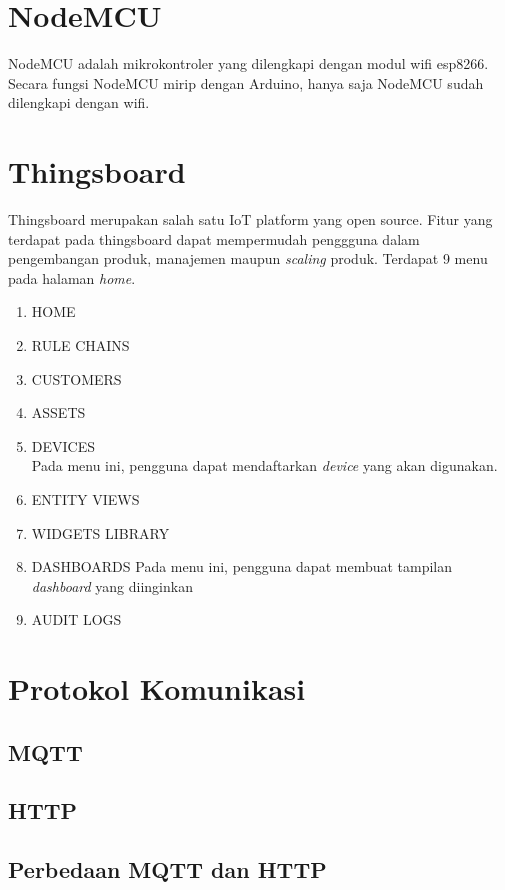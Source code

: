 \documentclass{class}
\begin{document}
  \section{NodeMCU}
  NodeMCU adalah mikrokontroler yang dilengkapi dengan modul wifi esp8266. 
  Secara fungsi NodeMCU mirip dengan Arduino, hanya saja NodeMCU sudah dilengkapi dengan wifi.

  \section{Thingsboard}
  Thingsboard merupakan salah satu IoT platform yang open source. 
  Fitur yang terdapat pada thingsboard dapat mempermudah penggguna dalam pengembangan produk, manajemen maupun \emph{scaling} produk. 
  Terdapat 9 menu pada halaman \emph{home}. 
    \begin{enumerate}
      \item HOME
      \item RULE CHAINS
      \item CUSTOMERS
      \item ASSETS
      \item DEVICES \\
      Pada menu ini, pengguna dapat mendaftarkan \emph{device} yang akan digunakan.
      \item ENTITY VIEWS
      \item WIDGETS LIBRARY
      \item DASHBOARDS
      Pada menu ini, pengguna dapat membuat tampilan \emph{dashboard} yang diinginkan
      \item AUDIT LOGS
    \end{enumerate}
  \section{Protokol Komunikasi}
  \subsection{MQTT}
  \subsection{HTTP}
  \subsection{Perbedaan MQTT dan HTTP}
\end{document}
